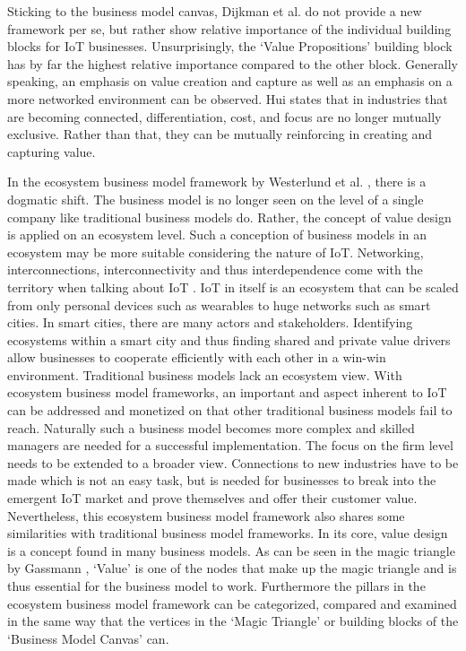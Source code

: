 		Sticking to the business model canvas, Dijkman et al. \cite{dijkman} do not provide a new framework per se, but rather show relative importance of the individual building blocks for IoT businesses. Unsurprisingly, the `Value Propositions' building block has by far the highest relative importance compared to the other block. Generally speaking, an emphasis on value creation and capture as well as an emphasis on a more networked environment can be observed. Hui \cite{hui} states that in industries that are becoming connected, differentiation, cost, and focus are no longer mutually exclusive. Rather than that, they can be mutually reinforcing in creating and capturing value.

		In the ecosystem business model framework by Westerlund et al. \cite{westerlund}, there is a dogmatic shift. The business model is no longer seen on the level of a single company like traditional business models do. Rather, the concept of value design is applied on an ecosystem level. Such a conception of business models in an ecosystem may be more suitable considering the nature of IoT. Networking, interconnections, interconnectivity and thus interdependence come with the territory when talking about IoT . IoT in itself is an ecosystem that can be scaled from only personal devices such as wearables to huge networks such as smart cities. In smart cities, there are many actors and stakeholders. Identifying ecosystems within a smart city and thus finding shared and private value drivers allow businesses to cooperate efficiently with each other in a win-win environment. Traditional business models lack an ecosystem view. With ecosystem business model frameworks, an important and aspect inherent to IoT can be addressed and monetized on that other traditional business models fail to reach. Naturally such a business model becomes more complex and skilled managers are needed for a successful implementation. The focus on the firm level needs to be extended to a broader view. Connections to new industries have to be made which is not an easy task, but is needed for businesses to break into the emergent IoT market and prove themselves and offer their customer value. Nevertheless, this ecosystem business model framework also shares some similarities with traditional business model frameworks. In its core, value design is a concept found in many business models. As can be seen in the magic triangle by Gassmann \cite{gassmann55}, `Value' is one of the nodes that make up the magic triangle and is thus essential for the business model to work. Furthermore the pillars in the ecosystem business model framework can be categorized, compared and examined in the same way that the vertices in the `Magic Triangle' or building blocks of the `Business Model Canvas' can.

